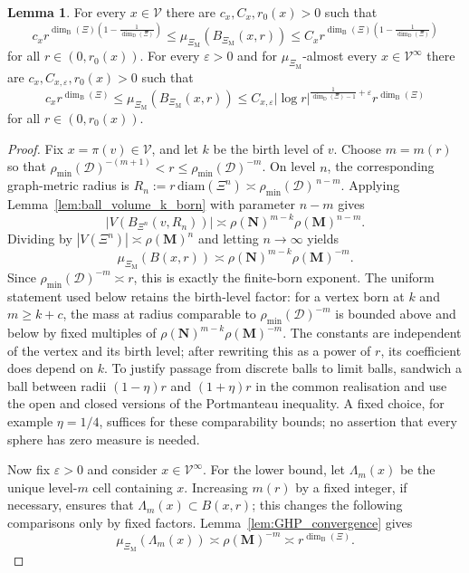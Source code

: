 \documentclass{article}
\DeclareRobustCommand{\revision}[1]{{\color{red}#1}}
\theoremstyle{plain}
\theoremstyle{definition}
\newtheorem{lemma}[theorem]{Lemma}
\newcommand{\diam}{\mathrm{diam}}
\newcommand{\dimbox}{\dim_\mathrm{B}}
\newcommand{\dimdeg}{\dim_\mathrm{D}}
\begin{document}
\begin{lemma}\label{lem:heat-volume}
For every $x\in \mathscr V$ there are $c_x,C_x,r_0(x)>0$ such that
\[
c_x r^{\dimbox(\Xi)\left(1-\frac{1}{\dimdeg(\Xi)}\right)}
\le
\mu_{\Xi_{\mathrm M}}(B_{\Xi_{\mathrm M}}(x,r))
\le
C_x r^{\dimbox(\Xi)\left(1-\frac{1}{\dimdeg(\Xi)}\right)}
\]
for all $r\in(0,r_0(x))$.
For every $\varepsilon>0$ and for $\mu_{\Xi_{\mathrm M}}$-almost every $x\in \mathscr V^\infty$ there are $c_x,C_{x,\varepsilon},r_0(x)>0$ such that
\[
c_x r^{\dimbox(\Xi)}
\le
\mu_{\Xi_{\mathrm M}}(B_{\Xi_{\mathrm M}}(x,r))
\le
C_{x,\varepsilon} |\log r|^{\frac{1}{\dimdeg(\Xi)-1}+\varepsilon} r^{\dimbox(\Xi)}
\]
for all $r\in(0,r_0(x))$.
\end{lemma}

\begin{proof}
Fix $x=\pi(v)\in\mathscr V$, and let $k$ be the birth level of $v$.
Choose $m=m(r)$ so that $\rho_{\min}(\mathcal D)^{-(m+1)}<r\le \rho_{\min}(\mathcal D)^{-m}$.
On level $n$, the corresponding graph-metric radius is $R_n:=r\,\diam(\Xi^n)\asymp \rho_{\min}(\mathcal D)^{\,n-m}$.
Applying Lemma~\ref{lem:ball_volume_k_born} with parameter $n-m$ gives
\[
|V(B_{\Xi^n}(v,R_n))|
\asymp
\rho(\mathbf N)^{m-k}\rho(\mathbf M)^{n-m}.
\]
Dividing by $|V(\Xi^n)|\asymp \rho(\mathbf M)^n$ and letting $n\to\infty$ yields
\[
\mu_{\Xi_{\mathrm M}}(B(x,r))
\asymp
\rho(\mathbf N)^{m-k}\rho(\mathbf M)^{-m}.
\]
Since $\rho_{\min}(\mathcal D)^{-m}\asymp r$, this is exactly the finite-born exponent.
\begingroup\color{red}
The uniform statement used below retains the birth-level factor:
for a vertex born at $k$ and $m\ge k+c$, the mass at radius comparable to
$\rho_{\min}(\mathcal D)^{-m}$ is bounded above and below by fixed
multiples of $\rho(\mathbf N)^{m-k}\rho(\mathbf M)^{-m}$.
The constants are independent of the vertex and its birth level; after
rewriting this as a power of $r$, its coefficient does depend on $k$.
To justify passage from discrete balls to limit balls, sandwich a ball
between radii $(1-\eta)r$ and $(1+\eta)r$ in the common realisation and
use the open and closed versions of the Portmanteau inequality. A fixed
choice, for example $\eta=1/4$, suffices for these comparability bounds;
no assertion that every sphere has zero measure is needed.
\endgroup{}


Now fix $\varepsilon>0$ and consider $x\in\mathscr V^\infty$.
For the lower bound, let $\Lambda_m(x)$ be the unique level-$m$ cell containing $x$.
\revision{Increasing $m(r)$ by a fixed integer, if necessary, ensures that $\Lambda_m(x)\subset B(x,r)$; this changes the following comparisons only by fixed factors. Lemma~\ref{lem:GHP_convergence} gives}
\[
\mu_{\Xi_{\mathrm M}}(\Lambda_m(x))
\asymp
\rho(\mathbf M)^{-m}
\asymp
r^{\dimbox(\Xi)}.
\]


\end{proof}
\end{document}
